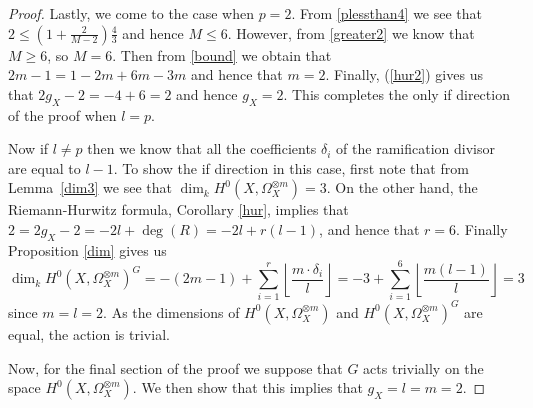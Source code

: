 \begin{proof}
    Lastly, we come to the case when $p=2$. From \eqref{plessthan4} we see that $2\leq \left(1+\frac{2}{M-2}\right)\frac{4}{3}$ 
    and hence $M\leq 6$. However, from \eqref{greater2} we know that $M\geq 6$, so $M=6$. Then from \eqref{bound}  we obtain that $2m-1=1-2m+6m-3m$
    and hence that $m=2$. Finally, (\ref{hur2}) gives us that $2g_X-2=-4+6=2$ and hence $g_X=2$. 
    This completes the only if direction of the proof when $l=p$.
    
    Now if $l\neq p$ then we know that all the coefficients $\delta_i$ of the ramification divisor are equal to $l-1$. 
    To show the if direction in this case, first note that from Lemma~\ref{dim3} we see that $\dim_kH^0(X,\Omega_X^{\otimes m})=3$. 
    On the other hand, the Riemann-Hurwitz formula, Corollary \ref{hur}, implies that $2 = 2g_X-2=-2l+\deg(R)=-2l+r(l-1)$, and hence that $r=6$. 
    Finally Proposition \ref{dim} gives us
        \begin{equation*}
        \dim_kH^0(X,\Omega_X^{\otimes m})^G = -(2m-1) + \sum_{i=1}^r \left\lfloor \frac{m\cdot \delta_i}{l} \right\rfloor
        = -3 +\sum_{i=1}^6 \left\lfloor \frac{m(l-1)}{l} \right\rfloor
        = 3
        \end{equation*}
    since $m=l=2$.
    As the dimensions of $H^0(X,\Omega_X^{\otimes m})$ and $H^0(X,\Omega_X^{\otimes m})^G$ are equal, the action is trivial.
    
    
    Now, for the final section of the proof we suppose that $G$ acts trivially on the space $H^0(X,\Omega_X^{\otimes m})$.
    We then show that this implies that $g_X=l=m=2$.
    

\end{proof}
